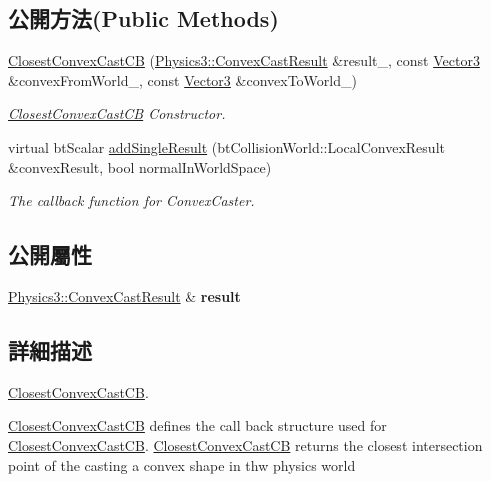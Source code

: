 \subsection*{公開方法(Public Methods)}
\begin{DoxyCompactItemize}
\item 
\hyperlink{struct_magnum_1_1_closest_convex_cast_c_b_a93172551ae713d9051df90098e2a9cc5}{Closest\+Convex\+Cast\+CB} (\hyperlink{class_magnum_1_1_physics3_1_1_convex_cast_result}{Physics3\+::\+Convex\+Cast\+Result} \&result\+\_\+, const \hyperlink{class_magnum_1_1_vector3}{Vector3} \&convex\+From\+World\+\_\+, const \hyperlink{class_magnum_1_1_vector3}{Vector3} \&convex\+To\+World\+\_\+)
\begin{DoxyCompactList}\small\item\em \hyperlink{struct_magnum_1_1_closest_convex_cast_c_b}{Closest\+Convex\+Cast\+CB} Constructor. \end{DoxyCompactList}\item 
virtual bt\+Scalar \hyperlink{struct_magnum_1_1_closest_convex_cast_c_b_af6d80d8ad8284143a693474953a2635d}{add\+Single\+Result} (bt\+Collision\+World\+::\+Local\+Convex\+Result \&convex\+Result, bool normal\+In\+World\+Space)
\begin{DoxyCompactList}\small\item\em The callback function for Convex\+Caster. \end{DoxyCompactList}\end{DoxyCompactItemize}
\subsection*{公開屬性}
\begin{DoxyCompactItemize}
\item 
\hyperlink{class_magnum_1_1_physics3_1_1_convex_cast_result}{Physics3\+::\+Convex\+Cast\+Result} \& {\bfseries result}\hypertarget{struct_magnum_1_1_closest_convex_cast_c_b_a7c8fe3689e3eed643f60673d363e7c84}{}\label{struct_magnum_1_1_closest_convex_cast_c_b_a7c8fe3689e3eed643f60673d363e7c84}

\end{DoxyCompactItemize}


\subsection{詳細描述}
\hyperlink{struct_magnum_1_1_closest_convex_cast_c_b}{Closest\+Convex\+Cast\+CB}. 

\hyperlink{struct_magnum_1_1_closest_convex_cast_c_b}{Closest\+Convex\+Cast\+CB} defines the call back structure used for \hyperlink{struct_magnum_1_1_closest_convex_cast_c_b}{Closest\+Convex\+Cast\+CB}. \hyperlink{struct_magnum_1_1_closest_convex_cast_c_b}{Closest\+Convex\+Cast\+CB} returns the closest intersection point of the casting a convex shape in thw physics world 

